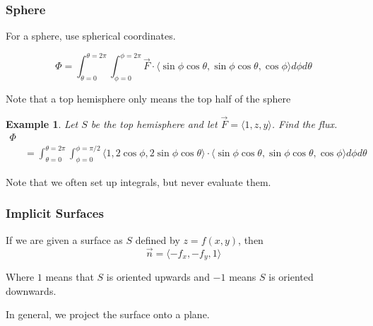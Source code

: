 \documentclass[11pt]{article}
\newtheorem{ex}{Example}
\begin{document}
\subsubsection{Sphere}
For a sphere, use spherical coordinates.

\[\Phi = \int_{\theta = 0}^{\theta = 2\pi} \int_{\phi = 0}^{\phi = 2\pi} \vec{F} \cdot \langle \sin\phi\cos\theta, \sin \phi \cos \theta, \cos \phi \rangle d\phi d\theta\]

Note that a top hemisphere only means the top half of the sphere
\begin{ex}
  Let $S$ be the top hemisphere and let $\vec{F} = \langle 1,z, y \rangle$. Find the flux.\\
  \begin{align*}
    \Phi \\
    &= \int_{\theta = 0}^{\theta = 2\pi} \int_{\phi = 0}^{\phi = \pi / 2} \langle 1, 2\cos\phi, 2\sin\phi\cos\theta \rangle \cdot
 \langle \sin\phi\cos\theta, \sin \phi \cos \theta, \cos \phi \rangle d\phi d\theta\
  \end{align*}
\end{ex}
Note that we often set up integrals, but never evaluate them.
\subsubsection{Implicit Surfaces}
If we are given a surface as $S$ defined by $z = f(x,y)$, then
\[\vec{n} = \langle -f_{x}, -f_{y}, 1 \rangle \]

Where $1$ means that $S$ is oriented upwards and $-1$ means $S$ is oriented downwards.

In general, we project the surface onto a plane.
\end{document}
